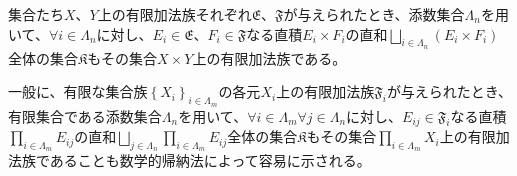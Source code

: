 \documentclass[dvipdfmx]{jsarticle}
\begin{document}
\begin{thm}\label{4.5.2.2}
集合たち$X$、$Y$上の有限加法族それぞれ$\mathfrak{E}$、$\mathfrak{F}$が与えられたとき、添数集合$\varLambda_{n}$を用いて、$\forall i \in \varLambda_{n}$に対し、$E_{i}\in \mathfrak{E}$、$F_{i}\in \mathfrak{F}$なる直積$E_{i} \times F_{i}$の直和$\bigsqcup_{i \in \varLambda_{n} } \left( E_{i} \times F_{i} \right)$全体の集合$\mathfrak{K}$もその集合$X \times Y$上の有限加法族である。
\end{thm}\par
一般に、有限な集合族$\left\{ X_{i} \right\}_{i \in \varLambda_{m} }$の各元$X_{i}$上の有限加法族$\mathfrak{F}_{i}$が与えられたとき、有限集合である添数集合$\varLambda_{n}$を用いて、$\forall i \in \varLambda_{m}\forall j \in \varLambda_{n}$に対し、$E_{ij} \in \mathfrak{F}_{i}$なる直積$\prod_{i \in \varLambda_{m} } E_{ij}$の直和$\bigsqcup_{j \in \varLambda_{n} } {\prod_{i \in \varLambda_{m} } E_{ij}}$全体の集合$\mathfrak{K}$もその集合$\prod_{i \in \varLambda_{m} } X_{i}$上の有限加法族であることも数学的帰納法によって容易に示される。
\end{document}
